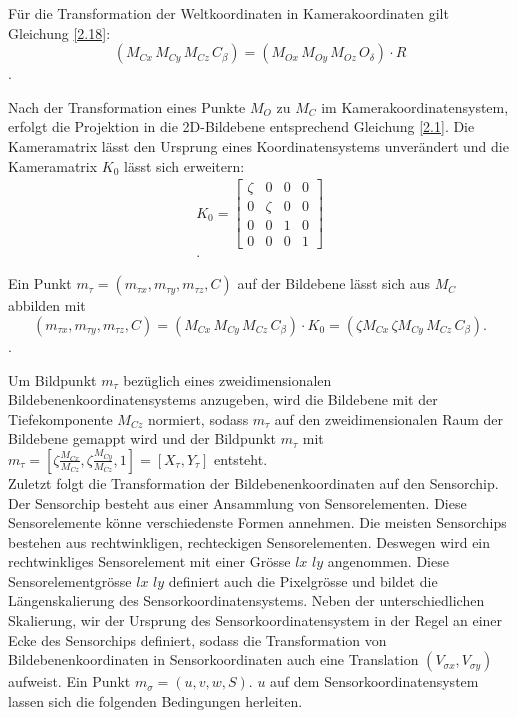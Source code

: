 Für die Transformation der Weltkoordinaten in Kamerakoordinaten gilt Gleichung \ref{2.18}:
\begin{equation}
 ({M_{Cx}}\,{M_{Cy}}\, {M_{Cz}}\, C_{\beta})=({M_{Ox}}\,{M_{Oy}}\,{M_{Oz}}\,O_{\delta}) \cdot R
\end{equation}. 

Nach der Transformation eines Punkte $M_O$ zu $M_C$ im Kamerakoordinatensystem, erfolgt die Projektion in die 2D-Bildebene entsprechend Gleichung \ref{2.1}. Die Kameramatrix lässt den Ursprung eines Koordinatensystems unverändert und die Kameramatrix $K_0$ lässt sich erweitern:
\begin{gather}
K_0 = 
\begin{bmatrix}
\zeta&0&0&0\\
0&\zeta&0&0\\
0&0&1&0\\
0&0&0&1
\end{bmatrix}\\.
\end{gather}

Ein Punkt $m_\tau=(m_{\tau x},m_{\tau y},m_{\tau z},C)$ auf der Bildebene lässt sich aus $M_C$ abbilden mit
\begin{equation}
(m_{\tau x},m_{\tau y},m_{\tau z},C)=({M_{Cx}}\,{M_{Cy}}\, {M_{Cz}}\, C_{\beta}) \cdot K_0 = (\zeta {M_{Cx}}\,\zeta{M_{Cy}}\, {M_{Cz}}\, C_{\beta}).
\end{equation}.

Um Bildpunkt $m_\tau$ bezüglich eines zweidimensionalen Bildebenenkoordinatensystems anzugeben, wird die Bildebene mit der Tiefekomponente $M_{Cz}$ normiert, sodass $m_\tau$ auf den zweidimensionalen Raum der Bildebene gemappt wird und der Bildpunkt $m_\tau$ mit $m_\tau = [\zeta \frac{M_{Cx}}{M_{Cz}},\zeta\frac{M_{Cy}}{M_{Cz}},1] = [X_\tau, Y_\tau]$ entsteht.\\

Zuletzt folgt die Transformation der Bildebenenkoordinaten auf den Sensorchip. Der Sensorchip besteht aus einer Ansammlung von Sensorelementen. Diese Sensorelemente könne verschiedenste Formen annehmen. Die meisten Sensorchips bestehen aus rechtwinkligen, rechteckigen Sensorelementen. Deswegen wird ein rechtwinkliges Sensorelement mit einer Grösse $lx$ $ly$ angenommen. Diese Sensorelementgrösse $lx$ $ly$ definiert auch die Pixelgrösse und bildet die Längenskalierung des Sensorkoordinatensystems. Neben der unterschiedlichen Skalierung, wir der Ursprung des Sensorkoordinatensystem in der Regel an einer Ecke des Sensorchips definiert, sodass die Transformation von Bildebenenkoordinaten in Sensorkoordinaten auch eine Translation $(V_{\sigma x},V_{\sigma y})$ aufweist. Ein Punkt $m_\sigma = ({u},{v},{w},S)$. ${u}$ auf dem Sensorkoordinatensystem lassen sich die folgenden Bedingungen herleiten. %


